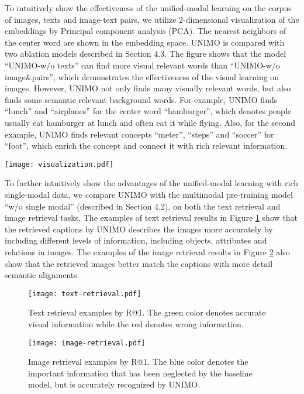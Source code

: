 \documentclass[11pt,a4paper]{article}
\begin{document}
To intuitively show the effectiveness of the unified-modal learning on the corpus of images, texts and image-text pairs, we utilize 2-dimensional visualization of the embeddings by Principal component analysis (PCA). 
The nearest neighbors of the center word are shown in the embedding space.
UNIMO is compared with two ablation models described in Section 4.3.
The figure shows that the model ``UNIMO-w/o texts'' can find more visual relevant words than ``UNIMO-w/o image\&pairs'', which demonstrates the effectiveness of the visual learning on images.
However, UNIMO not only finds many visually relevant words, but also finds some semantic relevant background words.
For example, UNIMO finds ``lunch'' and ``airplanes'' for the center word ``hamburger'', which denotes people usually eat hamburger at lunch and often eat it while flying.
Also, for the second example, UNIMO finds relevant concepts ``meter'', ``steps'' and ``soccer'' for ``foot'', which enrich the concept and connect it with rich relevant information.





\begin{figure*}[t!]
	\centering
	\texttt{[image: visualization.pdf]}
	\caption{2-dimensional visualization by PCA.}
	\label{fig:visualization}
\end{figure*}




To further intuitively show the advantages of the unified-modal learning with rich single-modal data, we compare UNIMO with the multimodal pre-training model ``w/o single modal'' (described in Section 4.2), on both the text retrieval and image retrieval tasks.
The examples of text retrieval results in Figure \ref{fig:text-retrieval} show that the retrieved captions by UNIMO describes the images more accurately by including different levels of information, including objects, attributes and relations in images.
The examples of the image retrieval results in Figure \ref{fig:image-retrieval} also show that the retrieved images better match the captions with more detail semantic alignments.
 



\begin{figure}[t!]
    \centering
    \texttt{[image: text-retrieval.pdf]}
    \caption{Text retrieval examples by R@1. The green color denotes accurate visual information while the red denotes wrong information.}
    \label{fig:text-retrieval}
\end{figure}


\begin{figure}[t!]
    \centering
    \texttt{[image: image-retrieval.pdf]}
    \caption{Image retrieval examples by R@1. The blue color denotes the important information that has been neglected by the baseline model, but is accurately recognized by UNIMO.}
    \label{fig:image-retrieval}
\end{figure}
\end{document}
